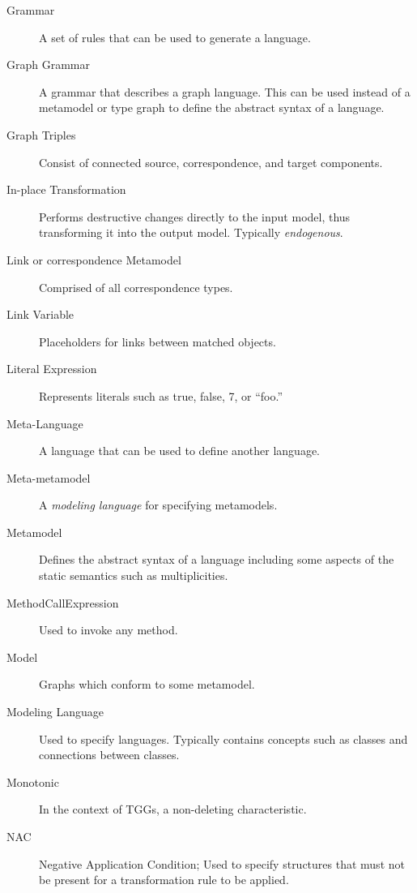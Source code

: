 \begin{description}
\item[Grammar] %
A set of rules that can be used to generate a language. 

\item[Graph Grammar] %
A grammar that describes a graph language. This can be used instead of a metamodel or type graph to define the abstract syntax of a language.

\item[Graph Triples] %
Consist of connected source, correspondence, and target components.

\item[In-place Transformation] 
Performs destructive changes directly to the input model, thus transforming it into the output model. Typically \emph{endogenous}.

\item[Link or correspondence Metamodel] %
Comprised of all correspondence types.

\item[Link Variable] %
Placeholders for links between matched objects.

\item[Literal Expression] %
Represents literals such as true, false, 7, or ``foo.''

\item[Meta-Language] %
A language that can be used to define another language.

\item[Meta-metamodel] %
A \emph{modeling language} for specifying metamodels.

\item[Metamodel] %
Defines the abstract syntax of a language including some aspects of the static semantics such as multiplicities. 

\item[MethodCallExpression] %
Used to invoke any method.

\item[Model] %
Graphs which conform to some metamodel.

\item[Modeling Language] %
Used to specify languages. Typically contains concepts such as classes and connections between classes.

\item[Monotonic] %
In the context of TGGs, a non-deleting characteristic.

\item[NAC] %
Negative Application Condition; Used to specify structures that must not be present for a transformation rule to be applied.


\end{description}
